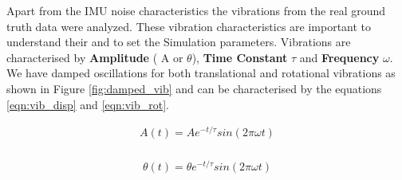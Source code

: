 
Apart from the IMU noise characteristics the vibrations from the real ground truth data were analyzed. These vibration characteristics are important to understand their and to set the Simulation parameters. Vibrations are characterised by \textbf{Amplitude} ( A or  $ \theta $), \textbf{Time Constant} $ \tau $ and \textbf{Frequency} $ \omega $. We have damped oscillations for both translational and rotational vibrations as shown in Figure \ref{fig:damped_vib} and can be characterised by the equations \ref{eqn:vib_disp} and \ref{eqn:vib_rot}.

\begin{equation}
  \label{eqn:vib_disp}
  \begin{aligned}
    A(t) = Ae^{-t/\tau}sin(2\pi\omega t) \\
  \end{aligned}
\end{equation}

\begin{equation}
  \label{eqn:vib_rot}
  \begin{aligned}
    \theta(t) = \theta e^{-t/\tau}sin(2\pi\omega t) \\
  \end{aligned}
\end{equation}




